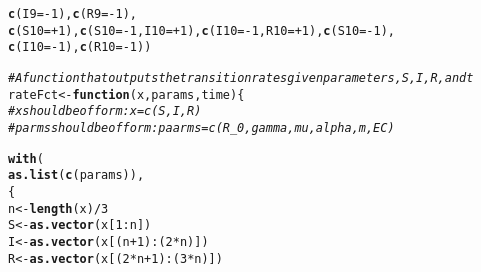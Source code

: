 \documentclass{article}\usepackage[]{graphicx}\usepackage[]{color}
\makeatletter
\newcommand{\hlnum}[1]{\textcolor[rgb]{0.686,0.059,0.569}{#1}}%
\newcommand{\hlcom}[1]{\textcolor[rgb]{0.678,0.584,0.686}{\textit{#1}}}%
\newcommand{\hlopt}[1]{\textcolor[rgb]{0,0,0}{#1}}%
\newcommand{\hlstd}[1]{\textcolor[rgb]{0.345,0.345,0.345}{#1}}%
\newcommand{\hlkwa}[1]{\textcolor[rgb]{0.161,0.373,0.58}{\textbf{#1}}}%
\newcommand{\hlkwb}[1]{\textcolor[rgb]{0.69,0.353,0.396}{#1}}%
\newcommand{\hlkwc}[1]{\textcolor[rgb]{0.333,0.667,0.333}{#1}}%
\newcommand{\hlkwd}[1]{\textcolor[rgb]{0.737,0.353,0.396}{\textbf{#1}}}%
\newenvironment{kframe}{%
 \def\at@end@of@kframe{}%
 \ifinner\ifhmode%
  \def\at@end@of@kframe{\end{minipage}}%
  \begin{minipage}{\columnwidth}%
 \fi\fi%
 \def\FrameCommand##1{\hskip\@totalleftmargin \hskip-\fboxsep
 \colorbox{shadecolor}{##1}\hskip-\fboxsep
     \hskip-\linewidth \hskip-\@totalleftmargin \hskip\columnwidth}%
 \MakeFramed {\advance\hsize-\width
   \@totalleftmargin\z@ \linewidth\hsize
   \@setminipage}}%
 {\par\unskip\endMakeFramed%
 \at@end@of@kframe}
\newenvironment{knitrout}{}{} %
\makeatother
\begin{document}
\begin{knitrout}
\begin{kframe}
\begin{alltt}
                    \hlkwd{c}\hlstd{(}\hlkwc{I9} \hlstd{=} \hlopt{-}\hlnum{1}\hlstd{),} \hlkwd{c}\hlstd{(}\hlkwc{R9} \hlstd{=} \hlopt{-}\hlnum{1}\hlstd{),}
                    \hlkwd{c}\hlstd{(}\hlkwc{S10} \hlstd{=} \hlopt{+}\hlnum{1}\hlstd{),} \hlkwd{c}\hlstd{(}\hlkwc{S10} \hlstd{=} \hlopt{-}\hlnum{1}\hlstd{,} \hlkwc{I10}\hlstd{=} \hlopt{+}\hlnum{1}\hlstd{),} \hlkwd{c}\hlstd{(}\hlkwc{I10} \hlstd{=} \hlopt{-}\hlnum{1}\hlstd{,} \hlkwc{R10}\hlstd{=} \hlopt{+}\hlnum{1}\hlstd{),} \hlkwd{c}\hlstd{(}\hlkwc{S10} \hlstd{=} \hlopt{-}\hlnum{1}\hlstd{),}
                    \hlkwd{c}\hlstd{(}\hlkwc{I10} \hlstd{=} \hlopt{-}\hlnum{1}\hlstd{),} \hlkwd{c}\hlstd{(}\hlkwc{R10} \hlstd{=} \hlopt{-}\hlnum{1}\hlstd{))}

  \hlcom{#A function that outputs the transition rates given parameters, S,I,R, and t}
  \hlstd{rateFct} \hlkwb{<-} \hlkwa{function}\hlstd{(}\hlkwc{x}\hlstd{,}\hlkwc{params}\hlstd{,}\hlkwc{time}\hlstd{)\{}
    \hlcom{#x should be of form: x=c(S,I,R)}
    \hlcom{#parms should be of form: paarms=c(R_0,gamma,mu,alpha,m,EC)}

    \hlkwd{with}\hlstd{(}
       \hlkwd{as.list}\hlstd{(}\hlkwd{c}\hlstd{(params)),}
       \hlstd{\{}
    \hlstd{n} \hlkwb{<-} \hlkwd{length}\hlstd{(x)}\hlopt{/}\hlnum{3}
    \hlstd{S} \hlkwb{<-} \hlkwd{as.vector}\hlstd{(x[}\hlnum{1}\hlopt{:}\hlstd{n])}
    \hlstd{I} \hlkwb{<-} \hlkwd{as.vector}\hlstd{(x[(n}\hlopt{+}\hlnum{1}\hlstd{)}\hlopt{:}\hlstd{(}\hlnum{2}\hlopt{*}\hlstd{n)])}
    \hlstd{R} \hlkwb{<-} \hlkwd{as.vector}\hlstd{(x[(}\hlnum{2}\hlopt{*}\hlstd{n}\hlopt{+}\hlnum{1}\hlstd{)}\hlopt{:}\hlstd{(}\hlnum{3}\hlopt{*}\hlstd{n)])}


\end{alltt}
\end{kframe}
\end{knitrout}
\end{document}
